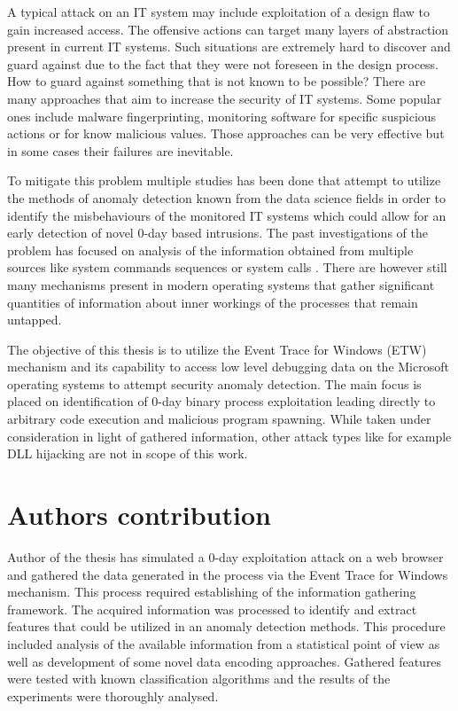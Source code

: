 \documentclass[a4paper,twoside,12pt]{book}
\begin{document}
A typical attack on an IT system may include exploitation of a design 
flaw to gain increased access. The offensive actions can target many layers of 
abstraction present in current IT systems. Such situations are extremely hard to discover 
and guard against due to the fact that they were not foreseen in the design process. How to guard 
against something that is not known to be possible? There are many approaches that aim to 
increase the security of IT systems. Some popular ones include malware fingerprinting, 
monitoring software for specific suspicious actions or for know 
malicious values. Those approaches can be very effective but in some cases their 
failures are inevitable.

To mitigate this problem multiple studies has been done that attempt to utilize the methods of
anomaly detection known from the data science fields in order to identify the misbehaviours of 
the monitored IT systems which could allow for an early detection of novel 0-day based intrusions.
The past investigations of the problem has focused on analysis of the information obtained from 
multiple sources like system commands sequences \cite{bib:lane1997application} or system calls 
\cite{bib:rsvm}. There are however still many mechanisms present in modern operating systems 
that gather significant quantities of information about inner workings of the processes that remain
untapped. 

The objective of this thesis is to utilize the Event Trace for Windows (ETW) mechanism and its 
capability to access low level debugging data on the Microsoft operating systems to attempt
security anomaly detection. The main focus is placed on identification of 0-day binary process 
exploitation leading directly to arbitrary code execution and malicious program spawning. While 
taken under consideration in light of gathered information, other attack types like for example 
DLL hijacking are not in scope of this work.

\section{Authors contribution}

Author of the thesis has simulated a 0-day exploitation attack on a web browser and gathered 
the data generated in the process via the Event Trace for Windows mechanism. This process 
required establishing of the information gathering framework. The acquired 
information was processed to identify and extract features that could be utilized in an anomaly detection
methods. This procedure included analysis of the available information from a statistical point of view
as well as development of some novel data encoding approaches. Gathered 
features were tested with known classification algorithms and the results of the experiments were thoroughly analysed.
\end{document}

